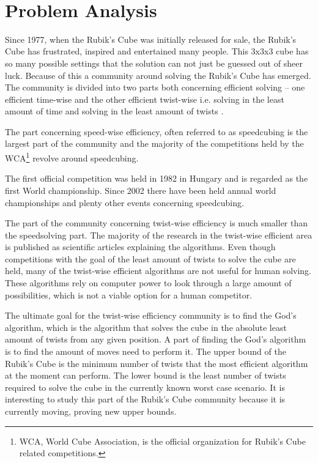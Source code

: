 \documentclass{article}
\begin{document}
\ \pagebreak{}

\section{Problem Analysis}
Since 1977, when the Rubik's Cube was initially released for sale, the Rubik's Cube has frustrated, inspired and entertained many people. This 3x3x3 cube has so many possible settings that the solution can not just be guessed out of sheer luck. Because of this a community around solving the Rubik's Cube has emerged. The community is divided into two parts both concerning efficient solving -- one efficient time-wise and the other efficient twist-wise i.e. solving in the least amount of time and solving in the least amount of twists \cite{speedsolving.forum}. 

The part concerning speed-wise efficiency, often referred to as speedcubing is the largest part of the community and the majority of the competitions held by the WCA\footnote{WCA, World Cube Association, is the official organization for Rubik's Cube related competitions.} \cite{wca} revolve around speedcubing.

The first official competition was held in 1982 in Hungary and is regarded as the first World championship. Since 2002 there have been held annual world championships and plenty other events concerning speedcubing. 

The part of the community concerning twist-wise efficiency is much smaller than the speedsolving part. The majority of the research in the twist-wise efficient area is published as scientific articles explaining the algorithms. Even though competitions with the goal of the least amount of twists to solve the cube are held, many of the twist-wise efficient algorithms are not useful for human solving. These algorithms rely on computer power to look through a large amount of possibilities, which is not a viable option for a human competitor.

The ultimate goal for the twist-wise efficiency community is to find the God's algorithm, which is the algorithm that solves the cube in the absolute least amount of twists from any given position. A part of finding the God's algorithm is to find the amount of moves need to perform it. The upper bound of the Rubik's Cube is the minimum number of twists that the most efficient algorithm at the moment can perform. The lower bound is the least number of twists required to solve the cube in the currently known worst case scenario. It is interesting to study this part of the Rubik's Cube community because it is currently moving, proving new upper bounds.
\end{document}
